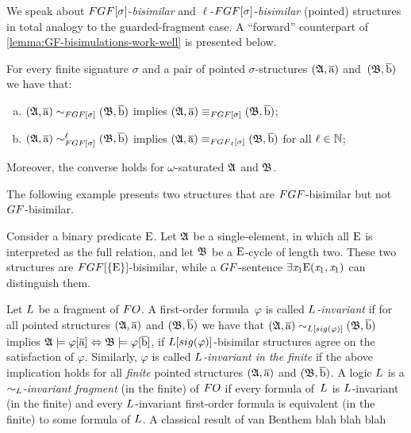 We speak about $\FGF[\sigma]$-\emph{bisimilar} and $\ell$-$\FGF[\sigma]$-\emph{bisimilar} (pointed) structures in total analogy to the guarded-fragment case.
A ``forward'' counterpart of \cref{lemma:GF-bisimulations-work-well} is presented below.
\begin{lemma}\label{lemma:FGF-bisimulations-work-well}
For every finite signature $\sigma$ and a pair of pointed $\sigma$-structures $({\mathfrak{A}}, \overline{\mathrm{a}})$ and~$({\mathfrak{B}}, \overline{\mathrm{b}})$ we have that:
\begin{enumerate}[(a)]
\item $(\str{A}, \elemtuplea) \bisimto_{\FGF[\sigma]} (\str{B}, \elemtupleb)$ implies $(\str{A}, \elemtuplea) \equiv_{\FGF[\sigma]} (\str{B}, \elemtupleb)$;
\item $(\str{A}, \elemtuplea) \bisimto_{\FGF[\sigma]}^{\ell} (\str{B}, \elemtupleb)$ implies $(\str{A}, \elemtuplea) \equiv_{\FGF_\ell[\sigma]} (\str{B}, \elemtupleb)$ for all $\ell \in {\mathbb{N}}$;
\end{enumerate}
Moreover, the converse holds for $\omega$-saturated ${\mathfrak{A}}$ and ${\mathfrak{B}}$.
\end{lemma}


The following example presents two structures that are $\FGF$-bisimilar but not $\GF$-bisimilar.
\begin{example} 
Consider a binary predicate $\mathrm{E}$.
Let ${\mathfrak{A}}$ be a single-element, in which all $\mathrm{E}$ is interpreted as the full relation, and let ${\mathfrak{B}}$ be a $\mathrm{E}$-cycle of length two. These two structures are $\FGF[\{\relE\}]$-bisimilar, while a $\GF$-sentence $\exists{\mathit{x}_1}\mathrm{E}(\mathit{x}_1,\mathit{x}_1)$ can distinguish them.
\end{example}

Let $\logicL$ be a fragment of $\FO$. 
A first-order formula~$\varphi$ is called \emph{$\logicL$-invariant}
if for all pointed structures $({\mathfrak{A}},\overline{\mathrm{a}})$ and $({\mathfrak{B}}, \overline{\mathrm{b}})$ we have that  
$(\str{A},\elemtuplea) \bisimto_{\logicL[\sig(\varphi)]} (\str{B}, \elemtupleb)$ implies
${\mathfrak{A}} \models \varphi[\overline{\mathrm{a}}] \Leftrightarrow {\mathfrak{B}} \models \varphi[\overline{\mathrm{b}}]$, \ie if $\logicL[\sig(\varphi)]$-bisimilar structures agree on the satisfaction of $\varphi$.
Similarly, $\varphi$ is called \emph{$\logicL$-invariant in the finite} if the above implication holds for all \emph{finite} pointed structures $({\mathfrak{A}},\overline{\mathrm{a}})$ and $({\mathfrak{B}}, \overline{\mathrm{b}})$.
A logic $\logicL$ is a \emph{$\bisimto_{\logicL}$-invariant fragment} (in the finite) of $\FO$ if every formula of~$\logicL$ is $\logicL$-invariant (in the finite) and every $\logicL$-invariant first-order formula is equivalent (in the finite) to some formula of $\logicL$.
A classical result of van Benthem blah blah blah

